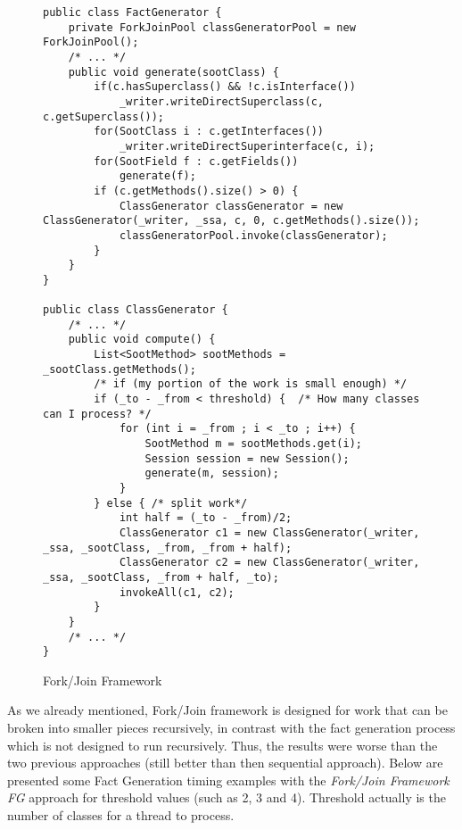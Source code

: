 \documentclass{dithesis}
\begin{document}
        \begin{figure}[H]
\begin{lstlisting}
public class FactGenerator {
    private ForkJoinPool classGeneratorPool = new ForkJoinPool();
    /* ... */
    public void generate(sootClass) {
        if(c.hasSuperclass() && !c.isInterface())
            _writer.writeDirectSuperclass(c, c.getSuperclass());
        for(SootClass i : c.getInterfaces())
            _writer.writeDirectSuperinterface(c, i);
        for(SootField f : c.getFields())
            generate(f);
        if (c.getMethods().size() > 0) {
            ClassGenerator classGenerator = new ClassGenerator(_writer, _ssa, c, 0, c.getMethods().size());
            classGeneratorPool.invoke(classGenerator);
        }
    }
}

public class ClassGenerator {
    /* ... */
    public void compute() {
        List<SootMethod> sootMethods = _sootClass.getMethods();
        /* if (my portion of the work is small enough) */
        if (_to - _from < threshold) {  /* How many classes can I process? */
            for (int i = _from ; i < _to ; i++) {
                SootMethod m = sootMethods.get(i);
                Session session = new Session();
                generate(m, session);
            }
        } else { /* split work*/
            int half = (_to - _from)/2;
            ClassGenerator c1 = new ClassGenerator(_writer, _ssa, _sootClass, _from, _from + half);
            ClassGenerator c2 = new ClassGenerator(_writer, _ssa, _sootClass, _from + half, _to);
            invokeAll(c1, c2);
        }
    }
    /* ... */
}
\end{lstlisting}
        \caption{Fork/Join Framework}
        \end{figure}
        As we already mentioned, Fork/Join framework is designed for work that can be broken into smaller pieces recursively, in contrast with the fact generation process which is not designed to run recursively. Thus, the results were worse than the two previous approaches (still better than then sequential approach). Below are presented some Fact Generation timing examples with the \textit{Fork/Join Framework FG} approach for threshold values (such as 2, 3 and 4). Threshold actually is the number of classes for a thread to process.
\end{document}
